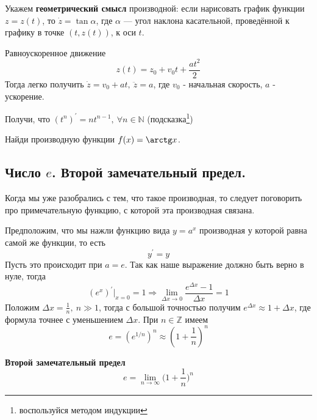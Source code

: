 Укажем \textbf{геометрический смысл} производной: если нарисовать график функции $z=z(t)$, то $\dot{z} = \tan \alpha$, где $\alpha$ — угол наклона касательной, проведённой к графику в точке $(t, z(t))$, к оси $t$.
\begin{example}
    Равноускоренное движение
    \begin{equation*}
        z(t) = z_0 + v_0t + \frac{at^2}{2}
    \end{equation*}
    Тогда легко получить $\dot{z}= v_0 + at,\ \ddot{z} = a$, где $v_0$ - начальная скорость, $a$ - ускорение.
\end{example}
\begin{prac}
    Получи, что $(t^{n})^{'} = n t^{n-1},\ \forall n \in \mathbb{N}$ (подсказка\footnote{воспользуйся методом индукции})
\end{prac}
\begin{prac}
    Найди производную функции $f(x) = \arctg x$.
\end{prac}

\subsection{Число $e$. Второй замечательный предел.}
Когда мы уже разобрались с тем, что такое производная, то следует поговорить про примечательную функцию, с которой эта производная связана.

Предположим, что мы нажли функцию вида $y = a^x$ производная у которой равна самой же функции, то есть
\begin{equation*}
    y^{'} = y
\end{equation*}
Пусть это происходит при $a = e$. Так как наше выражение должно быть верно в нуле, тогда
\begin{equation*}
    (e^x)^{'}|_{x = 0} = 1 \Rightarrow \lim_{\Delta x \rightarrow 0} \frac{e^{\Delta x} - 1}{\Delta x} = 1
\end{equation*}
Положим $\Delta x = \frac{1}{n},\ n\gg 1$, тогда с большой точностью получим $e^{\Delta x} \approx 1 + \Delta x$, где формула точнее с уменьшением $\Delta x$. При $n \in \mathbb{Z}$ имеем
\begin{equation*}
    e = (e^{1/n})^{n} \approx (1 + \frac{1}{n})^{n}
\end{equation*}
\begin{theorem}
    \textbf{Второй замечательный предел}
    \begin{equation*}
        e = \lim_{n \rightarrow \infty} \bigl(1 + \frac{1}{n}\bigr)^{n}
    \end{equation*}
\end{theorem}

